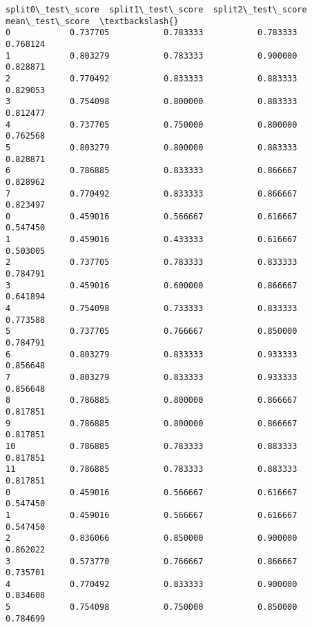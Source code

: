 \documentclass[11pt]{article}
\begin{document}
\begin{tcolorbox}[breakable, size=fbox, boxrule=.5pt, pad at break*=1mm, opacityfill=0]
\begin{Verbatim}[commandchars=\\\{\}]
    split0\_test\_score  split1\_test\_score  split2\_test\_score  mean\_test\_score  \textbackslash{}
0            0.737705           0.783333           0.783333         0.768124
1            0.803279           0.783333           0.900000         0.828871
2            0.770492           0.833333           0.883333         0.829053
3            0.754098           0.800000           0.883333         0.812477
4            0.737705           0.750000           0.800000         0.762568
5            0.803279           0.800000           0.883333         0.828871
6            0.786885           0.833333           0.866667         0.828962
7            0.770492           0.833333           0.866667         0.823497
0            0.459016           0.566667           0.616667         0.547450
1            0.459016           0.433333           0.616667         0.503005
2            0.737705           0.783333           0.833333         0.784791
3            0.459016           0.600000           0.866667         0.641894
4            0.754098           0.733333           0.833333         0.773588
5            0.737705           0.766667           0.850000         0.784791
6            0.803279           0.833333           0.933333         0.856648
7            0.803279           0.833333           0.933333         0.856648
8            0.786885           0.800000           0.866667         0.817851
9            0.786885           0.800000           0.866667         0.817851
10           0.786885           0.783333           0.883333         0.817851
11           0.786885           0.783333           0.883333         0.817851
0            0.459016           0.566667           0.616667         0.547450
1            0.459016           0.566667           0.616667         0.547450
2            0.836066           0.850000           0.900000         0.862022
3            0.573770           0.766667           0.866667         0.735701
4            0.770492           0.833333           0.900000         0.834608
5            0.754098           0.750000           0.850000         0.784699


\end{Verbatim}
\end{tcolorbox}
\end{document}
